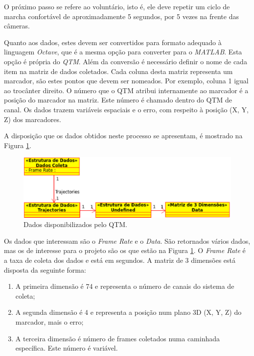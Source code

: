 O próximo passo se refere ao voluntário, isto é, ele deve repetir um ciclo de marcha confortável de aproximadamente 5 segundos, por 5 vezes na frente das câmeras.

Quanto aos dados, estes devem ser convertidos para formato adequado à linguagem \emph{Octave}, que é a mesma opção para converter para o \emph{MATLAB}. Esta opção é própria do \emph{QTM}. 
Além da conversão é necessário definir o nome de cada item na matriz de dados coletados. 
Cada coluna desta matriz representa um marcador, são estes pontos que devem ser nomeados. 
Por exemplo, coluna 1 igual ao trocânter direito. 
O número que o QTM atribui internamente ao marcador é a posição do marcador na matriz. 
Este número é chamado dentro do QTM de canal. 
Os dados trazem variáveis espaciais e o erro, com respeito à posição (X, Y, Z) dos marcadores.

A disposição que os dados obtidos neste processo se apresentam, é mostrado na Figura \ref{dados_qtm}.

\begin{figure}[ht]
 \centering
 \includegraphics[width=15cm]{figuras/dados_qtm.eps}
 \caption{Dados disponibilizados pelo QTM.}
 \label{dados_qtm}
\end{figure}

Os dados que interessam são o \emph{Frame Rate} e o \emph{Data}.
São retornados vários dados, mas os de interesse para o projeto são os que estão na Figura \ref{dados_qtm}. 
O \emph{Frame Rate} é a taxa de coleta dos dados e está em segundos. 
A matriz de 3 dimensões está disposta da seguinte forma:
\begin{enumerate}
	\item A primeira dimensão é 74 e representa o número de canais do sistema de coleta;
	\item A segunda dimensão é 4 e representa a posição num plano 3D (X, Y, Z) do marcador, mais o erro;
	\item A terceira dimensão é número de frames coletados numa caminhada específica. Este número é variável.
\end{enumerate}



